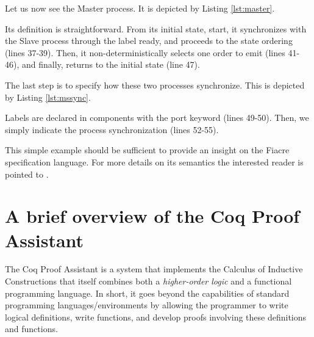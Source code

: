     Let us now see the \textsf{Master} process. It is depicted by Listing \ref{lst:master}.
    
	 	   
    
    \noindent Its definition is straightforward. From its initial state, \textsf{start},
    it synchronizes with the \textsf{Slave} process through the label \textsf{ready},
    and proceeds to the state \textsf{ordering} (lines 37-39). Then, it non-deterministically
    selects one order to emit (lines 41-46), and finally, 
    returns to the initial state (line 47).

	The last step is to specify how these two processes synchronize. This is depicted
	by Listing \ref{lst:mssync}.

		 

	\noindent Labels are declared in components with the \textsf{port} keyword (lines 49-50).
	Then, we simply indicate the process synchronization (lines 52-55).

	This simple example should be sufficient to provide an insight on the
	Fiacre specification language. For more details on its semantics the interested reader
	is pointed to \cite{fiacre2009}.


\section{A brief overview of the Coq Proof Assistant}
\label{sec:coq}



  
	The Coq Proof Assistant \cite{09thecoq} is a system that implements the
	Calculus of Inductive Constructions \cite{opac-b1101046} that itself combines both a \textit{higher-order logic} and 
	a functional programming language. In short, it goes beyond the capabilities 
	of standard programming languages/environments by allowing the programmer to write logical definitions,
	write functions, and develop proofs involving these definitions and functions. 
	
